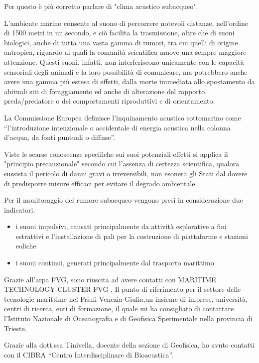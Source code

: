 Per questo è più corretto parlare di "clima acustico subacqueo". 

L’ambiente marino consente al suono di percorrere notevoli distanze, nell’ordine di 1500 metri in un secondo, e ciò facilita la trasmissione, oltre che di suoni biologici, anche di tutta una vasta gamma di rumori, tra cui quelli di origine antropica, riguardo ai quali la comunità scientifica muove una sempre maggiore attenzione. Questi suoni, infatti, non interferiscono unicamente con le capacità sensoriali degli animali e la loro possibilità di comunicare, ma potrebbero anche avere una gamma più estesa di effetti, dalla morte immediata allo spostamento da abituali siti di foraggiamento ed anche di alterazione del rapporto preda/predatore o dei comportamenti riproduttivi e di orientamento. 

La Commissione Europea definisce l’inquinamento acustico sottomarino come “l’introduzione intenzionale o accidentale di energia acustica nella colonna d’acqua, da fonti puntuali o diffuse”.

Viste le scarse conoscenze specifiche sui suoi potenziali effetti si applica il "principio precauzionale" secondo cui l’assenza di certezza scientifica, qualora sussista il pericolo di danni gravi o irreversibili, non esonera gli Stati dal dovere di predisporre misure efficaci per evitare il degrado ambientale.

Per il monitoraggio del rumore subacqueo vengono presi in considerazione due indicatori:

\begin{itemize}
\item i suoni impulsivi, causati principalmente da attività esplorative a fini estrattivi e l’installazione di pali per la costruzione di piattaforme e stazioni eoliche
\item i suoni continui, generati principalmente dal trasporto marittimo
\end{itemize}

Grazie all'arpa FVG, sono riuscita ad avere contatti con MARITIME TECHNOLOGY CLUSTER FVG , Il punto di riferimento per il settore delle tecnologie marittime nel Friuli Venezia Giulia,un insieme di imprese, università, centri di ricerca, enti di formazione, il quale mi ha consigliato di contattare l'Istituto Nazionale di Oceanografia e di Geofisica Sperimentale nella provincia di Trieste. 

Grazie alla dott.ssa Tinivella, docente della sezione di Geofisica, ho avuto contatti con il CIBRA “Centro Interdisciplinare di Bioacustica”. 

